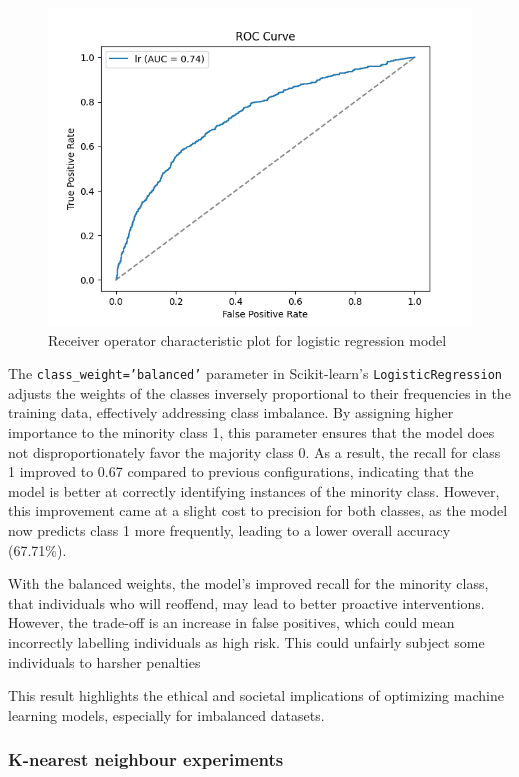 	\begin{figure}[H]
		\centering
		\includegraphics[width=0.7\linewidth]{img/logistic_regression_roc}
		\caption{Receiver operator characteristic plot for logistic regression model}
		\label{fig:logisticregressionroc}
	\end{figure}
	
	
	The \texttt{class\_weight='balanced'} parameter in Scikit-learn's \texttt{LogisticRegression} adjusts the weights of the classes inversely proportional to their frequencies in the training data, effectively addressing class imbalance. By assigning higher importance to the minority class 1, this parameter ensures that the model does not disproportionately favor the majority class 0. As a result, the recall for class 1 improved to 0.67 compared to previous configurations, indicating that the model is better at correctly identifying instances of the minority class. However, this improvement came at a slight cost to precision for both classes, as the model now predicts class 1 more frequently, leading to a lower overall accuracy (67.71\%). 
	
	With the balanced weights, the model's improved recall for the minority class, that individuals who will reoffend,  may lead to better proactive interventions. However, the trade-off is an increase in false positives, which could mean incorrectly labelling individuals as high risk. This could unfairly subject some individuals to harsher penalties
	
	This result highlights the ethical and societal implications of optimizing machine learning models, especially for imbalanced datasets.
	
	
	
	\bigskip
	\subsubsection{K-nearest neighbour experiments}
	
